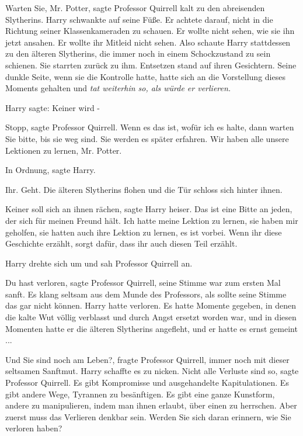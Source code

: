 \glqq{}Warten Sie, Mr. Potter\grqq{}, sagte Professor Quirrell kalt zu den
abreisenden Slytherins. Harry schwankte auf seine Füße. Er achtete darauf, nicht
in die Richtung seiner Klassenkameraden zu schauen. Er wollte nicht sehen, wie
sie ihn jetzt ansahen. Er wollte ihr Mitleid nicht sehen. Also schaute Harry
stattdessen zu den älteren Slytherins, die immer noch in einem Schockzustand zu
sein schienen. Sie starrten zurück zu ihm. Entsetzen stand auf ihren Gesichtern.
Seine dunkle Seite, wenn sie die Kontrolle hatte, hatte sich an die Vorstellung
dieses Moments gehalten und \emph{tat weiterhin so, als würde er verlieren.}

Harry sagte: \glqq{}Keiner wird -\grqq{}

\glqq{}Stopp\grqq{}, sagte Professor Quirrell. \glqq{}Wenn es das ist, wofür ich
es halte, dann warten Sie bitte, bis sie weg sind. Sie werden es später
erfahren. Wir haben alle unsere Lektionen zu lernen, Mr. Potter.\grqq{}

\glqq{}In Ordnung\grqq{}, sagte Harry.

\glqq{}Ihr. Geht.\grqq{} Die älteren Slytherins flohen und die Tür schloss sich
hinter ihnen.

\glqq{}Keiner soll sich an ihnen rächen\grqq{}, sagte Harry heiser. \glqq{}Das ist
eine Bitte an jeden, der sich für meinen Freund hält. Ich hatte meine Lektion zu
lernen, sie haben mir geholfen, sie hatten auch ihre Lektion zu lernen, es ist
vorbei. Wenn ihr diese Geschichte erzählt, sorgt dafür, dass ihr auch diesen
Teil erzählt.\grqq{}

Harry drehte sich um und sah Professor Quirrell an.

\glqq{}Du hast verloren\grqq{}, sagte Professor Quirrell, seine Stimme war zum
ersten Mal sanft. Es klang seltsam aus dem Munde des Professors, als sollte
seine Stimme das gar nicht können. Harry hatte verloren. Es hatte Momente
gegeben, in denen die kalte Wut völlig verblasst und durch Angst ersetzt worden
war, und in diesen Momenten hatte er die älteren Slytherins angefleht, und er
hatte es ernst gemeint ...

\glqq{}Und Sie sind noch am Leben?\grqq{}, fragte Professor Quirrell, immer noch
mit dieser seltsamen Sanftmut. Harry schaffte es zu nicken. \glqq{}Nicht alle
Verluste sind so\grqq{}, sagte Professor Quirrell. \glqq{}Es gibt Kompromisse und
ausgehandelte Kapitulationen. Es gibt andere Wege, Tyrannen zu besänftigen. Es
gibt eine ganze Kunstform, andere zu manipulieren, indem man ihnen erlaubt, über
einen zu herrschen. Aber zuerst muss das Verlieren denkbar sein. Werden Sie sich
daran erinnern, wie Sie verloren haben?\grqq{}

